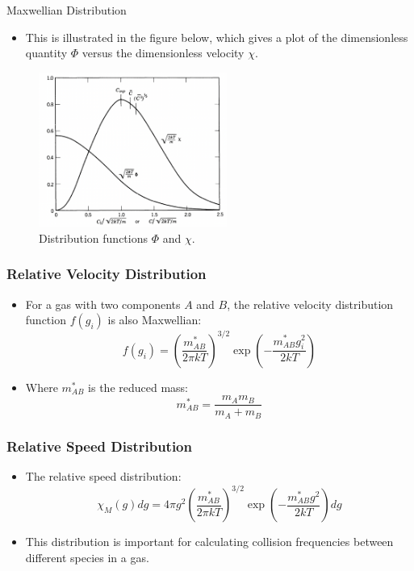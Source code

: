 \documentclass{beamer}
\begin{document}
\begin{frame}{Maxwellian Distribution}

\begin{itemize}
    \item This is illustrated in the figure below, which gives a plot of the dimensionless quantity $\Phi$ versus the dimensionless velocity $\chi$.
\end{itemize}
    \begin{figure}
        \centering
        \includegraphics[width=0.55\textwidth]{Maxwellian.png}
        \caption{Distribution functions $\Phi$ and $\chi$.}
    \end{figure}
\end{frame}


\begin{frame}
\frametitle{Relative Velocity Distribution}
\begin{itemize}
    \item For a gas with two components \( A \) and \( B \), the relative velocity distribution function \( f(g_i) \) is also Maxwellian:
    \[
    f(g_i) = \left( \frac{m_{AB}^*}{2\pi k T} \right)^{3/2} \exp \left( - \frac{m_{AB}^* g_i^2}{2 k T} \right)
    \]
    \item Where \( m_{AB}^* \) is the reduced mass:
    \[
    m_{AB}^* = \frac{m_A m_B}{m_A + m_B}
    \]
\end{itemize}
\end{frame}

\begin{frame}
\frametitle{Relative Speed Distribution}
\begin{itemize}
    \item The relative speed distribution:
    \[
    \chi_M(g) dg = 4\pi g^2 \left( \frac{m_{AB}^*}{2 \pi k T} \right)^{3/2} \exp \left( - \frac{m_{AB}^* g^2}{2 k T} \right) dg
    \]
    \item This distribution is important for calculating collision frequencies between different species in a gas.
\end{itemize}
\end{frame}
\end{document}
